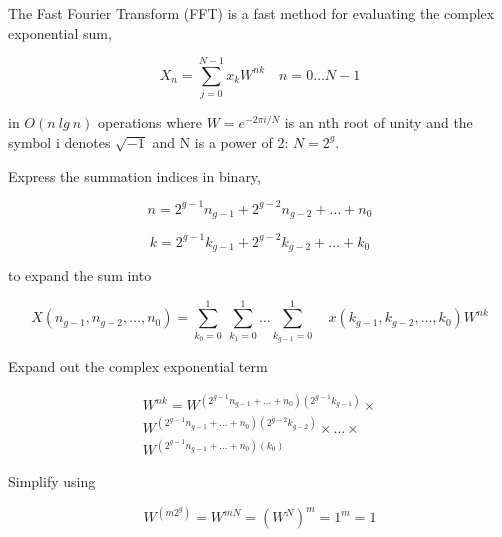 \documentclass{article}
\begin{document}
The Fast Fourier Transform (FFT) is a fast method for evaluating the complex exponential sum,

\begin{displaymath}
X_n = \sum_{j=0}^{N-1} x_k W^{nk} \quad n = 0 \ldots N-1
\end{displaymath}

in \begin{math} O(n \: lg \: n) \end{math} operations where \begin{math} W = e^{-2 \pi i / N} \end{math}
is an nth root of unity and the symbol i denotes \begin{math} \sqrt {-1} \end{math}
and N is a power of 2:  \begin{math}N = 2^g \end{math}.

Express the summation indices in binary, 

\begin{displaymath}
n = 2^{g-1} n_{g-1} + 2^{g-2} n_{g-2} + \ldots + n_0
\end{displaymath}

\begin{displaymath}
k = 2^{g-1} k_{g-1} + 2^{g-2} k_{g-2} + \ldots + k_0
\end{displaymath}

to expand the sum into

\begin{displaymath}
X(n_{g-1}, n_{g-2}, \ldots, n_0 ) = 
\sum_{k_0=0}^1 \: \sum_{k_1=0}^1\ldots \sum_{k_{g-1}=0}^1 \quad x(k_{g-1}, k_{g-2}, \ldots , k_0) W^{nk}
\end{displaymath}

Expand out the complex exponential term

\begin{eqnarray}
W^{n k} = 
W^{(2^{g-1} n_{g-1} + \ldots + n_0) (2^{g-1}k_{g-1})} \times \nonumber \\
W^{(2^{g-1} n_{g-1} + \ldots + n_0) (2^{g-2}k_{g-2})}  \times \ldots \times \nonumber \\
W^{(2^{g-1} n_{g-1} + \ldots + n_0) (k_0)} \nonumber
\end{eqnarray}

Simplify using

\begin{displaymath}
W^{(m 2^g)} = W^{mN} = (W^N)^m = 1^m = 1
\end{displaymath}
\end{document}
